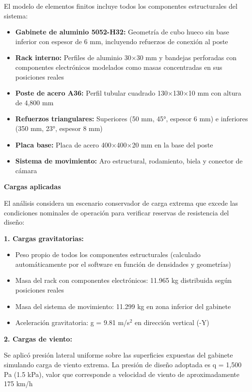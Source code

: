 \documentclass[12pt,a4paper,oneside]{report}
\begin{document}
El modelo de elementos finitos incluye todos los componentes estructurales del sistema:

\begin{itemize}
\item
  \textbf{Gabinete de aluminio 5052-H32:} Geometría de cubo hueco sin base inferior con espesor de 6 mm, incluyendo refuerzos de conexión al poste
\item
  \textbf{Rack interno:} Perfiles de aluminio 30\ensuremath{\times}30 mm y bandejas perforadas con componentes electrónicos modelados como masas concentradas en sus posiciones reales
\item
  \textbf{Poste de acero A36:} Perfil tubular cuadrado 130\ensuremath{\times}130\ensuremath{\times}10 mm con altura de 4,800 mm
\item
  \textbf{Refuerzos triangulares:} Superiores (50 mm, 45°, espesor 6 mm) e inferiores (350 mm, 23°, espesor 8 mm)
\item
  \textbf{Placa base:} Placa de acero 400\ensuremath{\times}400\ensuremath{\times}20 mm en la base del poste
\item
  \textbf{Sistema de movimiento:} Aro estructural, rodamiento, biela y conector de cámara
\end{itemize}

\textbf{Cargas aplicadas}

El análisis considera un escenario conservador de carga extrema que excede las condiciones nominales de operación para verificar reservas de resistencia del diseño:

\textbf{1. Cargas gravitatorias:}

\begin{itemize}
\item
  Peso propio de todos los componentes estructurales (calculado automáticamente por el software en función de densidades y geometrías)
\item
  Masa del rack con componentes electrónicos: 11.965 kg distribuida según posiciones reales
\item
  Masa del sistema de movimiento: 11.299 kg en zona inferior del gabinete
\item
  Aceleración gravitatoria: g = 9.81 m/s\ensuremath{^{2}} en dirección vertical (-Y)
\end{itemize}

\textbf{2. Cargas de viento:}

Se aplicó presión lateral uniforme sobre las superficies expuestas del gabinete simulando carga de viento extrema. La presión de diseño adoptada es q = 1,500 Pa (1.5 kPa), valor que corresponde a velocidad de viento de aproximadamente 175 km/h
\end{document}
